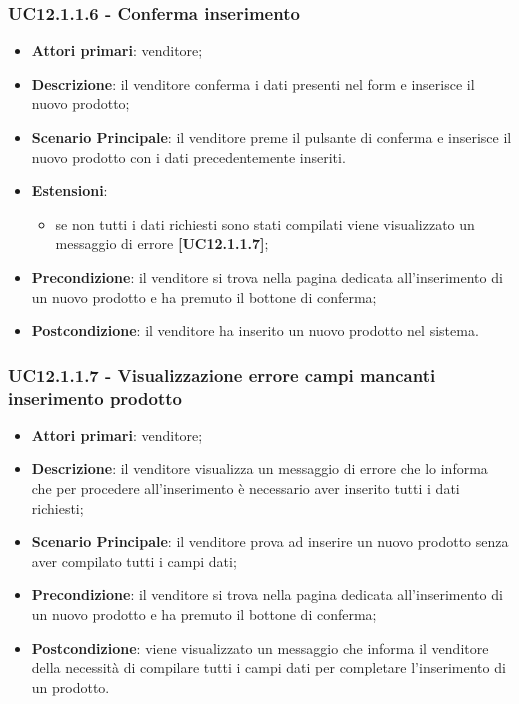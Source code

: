 \subsubsection{UC12.1.1.6 - Conferma inserimento}
\begin{itemize}
\item \textbf{Attori primari}: venditore;
\item \textbf{Descrizione}: il venditore conferma i dati presenti nel form e inserisce il nuovo prodotto;
\item \textbf{Scenario Principale}: il venditore preme il pulsante di conferma e inserisce il nuovo prodotto con i dati precedentemente inseriti.
\item \textbf{Estensioni}: 
\begin{itemize}
	\item se non tutti i dati richiesti sono stati compilati viene visualizzato un messaggio di errore \textbf{[UC12.1.1.7]};
\end{itemize} 
\item \textbf{Precondizione}: il venditore si trova nella pagina dedicata all'inserimento di un nuovo prodotto e ha premuto il bottone di conferma;
\item \textbf{Postcondizione}: il venditore ha inserito un nuovo prodotto nel sistema.
\end{itemize}

\subsubsection{UC12.1.1.7 - Visualizzazione errore campi mancanti inserimento prodotto}
\begin{itemize}
\item \textbf{Attori primari}: venditore;
\item \textbf{Descrizione}: il venditore visualizza un messaggio di errore che lo informa che per procedere all'inserimento è necessario aver inserito tutti i dati richiesti;
\item \textbf{Scenario Principale}: il venditore prova ad inserire un nuovo prodotto senza aver compilato tutti i campi dati;
\item \textbf{Precondizione}: il venditore si trova nella pagina dedicata all'inserimento di un nuovo prodotto e ha premuto il bottone di conferma;
\item \textbf{Postcondizione}: viene visualizzato un messaggio che informa il venditore della necessità di compilare tutti i campi dati per completare l'inserimento di un prodotto.
\end{itemize}

